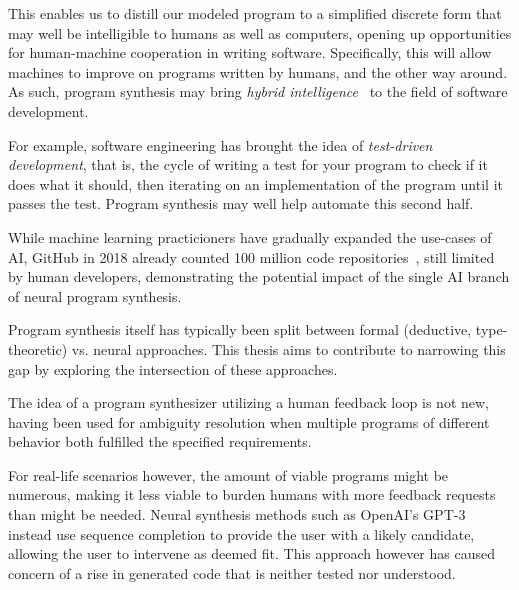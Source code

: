\documentclass{article}
\begin{document}

This enables us to distill our modeled program
to a simplified discrete form that may well be intelligible to humans as well as computers,
opening up opportunities for human-machine cooperation in writing software.
Specifically, this will allow machines to improve on programs written by humans, and the other way around.
As such, program synthesis may bring \emph{hybrid intelligence}~\citep{sun1994computational} to the field of software development.


For example, software engineering has brought the idea of \emph{test-driven development},
that is, the cycle of writing a test for your program to check if it does what it should,
then iterating on an implementation of the program until it passes the test.
Program synthesis may well help automate this second half.


While machine learning practicioners have gradually expanded the use-cases of AI,
GitHub in 2018 already counted 100 million code repositories~\citep{github100m},
still limited by human developers,
demonstrating the potential impact of the single AI branch of neural program synthesis.

Program synthesis itself has typically been split between formal (deductive, type-theoretic) vs. neural approaches.
This thesis aims to contribute to narrowing this gap by exploring the intersection of these approaches.

The idea of a program synthesizer utilizing a human feedback loop is not new,
having been used for ambiguity resolution when multiple programs
of different behavior both fulfilled the specified requirements.

For real-life scenarios however, the amount of viable programs might be numerous,
making it less viable to burden humans with more feedback requests than might be needed.
Neural synthesis methods such as OpenAI's GPT-3~\citep{gpt3code}
instead use sequence completion to provide the user with a likely candidate,
allowing the user to intervene as deemed fit.
This approach however has caused concern of a rise in generated code
that is neither tested nor understood.~\citep{gpt3bugs}
\end{document}
